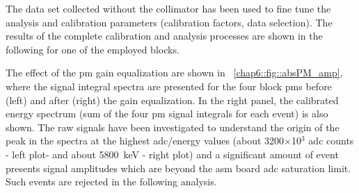 The data set collected without the collimator has been used to fine tune the analysis and calibration parameters (calibration factors, data selection). The results of the complete calibration and analysis processes are shown in the following for one of the employed blocks.

The effect of the \gls{pm} gain equalization are shown in \figurename~\ref{chap6::fig::absPM_amp}, where the signal integral spectra are presented for the four block \glspl{pm} before (left) and after (right) the gain equalization. In the right panel, the calibrated energy spectrum (sum of the four \gls{pm} signal integrals for each event) is also shown. 
The raw signals have been investigated to understand the origin of the peak in the spectra at the highest \gls{adc}/energy values (about 3200$\times$10$^3$ \gls{adc} counts - left plot- and about 5800~keV - right plot) and a significant amount of event presents signal amplitudes which are beyond the \gls{asm} board \gls{adc} saturation limit. Such events are rejected in the following analysis. 


